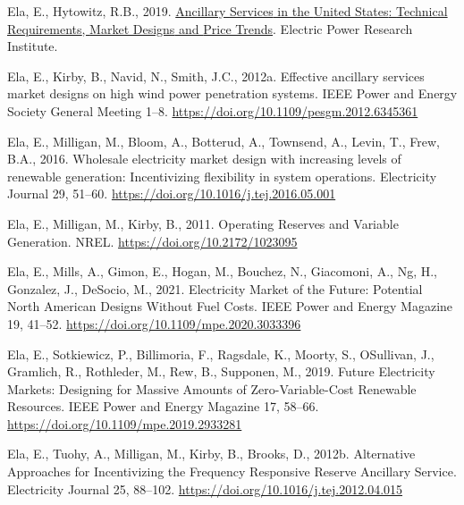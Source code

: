 \documentclass[12pt,a4paper,]{report}
\newlength{\cslhangindent}
\newenvironment{CSLReferences}[2] %
 {%
  \setlength{\parindent}{0pt}
  \ifodd #1 \everypar{\setlength{\hangindent}{\cslhangindent}}\ignorespaces\fi
  \ifnum #2 > 0
  \setlength{\parskip}{#2\baselineskip}
  \fi
 }%
 {}
\begin{document}
\begin{CSLReferences}{1}{0}
\leavevmode{}%
Ela, E., Hytowitz, R.B., 2019.
\href{https://www.epri.com/research/products/000000003002015670}{Ancillary
{Services} in the {United States}: {Technical Requirements}, {Market
Designs} and {Price Trends}}. {Electric Power Research Institute}.

\leavevmode{}%
Ela, E., Kirby, B., Navid, N., Smith, J.C., 2012a. Effective ancillary
services market designs on high wind power penetration systems. IEEE
Power and Energy Society General Meeting 1--8.
\url{https://doi.org/10.1109/pesgm.2012.6345361}

\leavevmode{}%
Ela, E., Milligan, M., Bloom, A., Botterud, A., Townsend, A., Levin, T.,
Frew, B.A., 2016. Wholesale electricity market design with increasing
levels of renewable generation: {Incentivizing} flexibility in system
operations. Electricity Journal 29, 51--60.
\url{https://doi.org/10.1016/j.tej.2016.05.001}

\leavevmode{}%
Ela, E., Milligan, M., Kirby, B., 2011. Operating {Reserves} and
{Variable Generation}. {NREL}. \url{https://doi.org/10.2172/1023095}

\leavevmode{}%
Ela, E., Mills, A., Gimon, E., Hogan, M., Bouchez, N., Giacomoni, A.,
Ng, H., Gonzalez, J., DeSocio, M., 2021. Electricity {Market} of the
{Future}: {Potential North American Designs Without Fuel Costs}. IEEE
Power and Energy Magazine 19, 41--52.
\url{https://doi.org/10.1109/mpe.2020.3033396}

\leavevmode{}%
Ela, E., Sotkiewicz, P., Billimoria, F., Ragsdale, K., Moorty, S.,
OSullivan, J., Gramlich, R., Rothleder, M., Rew, B., Supponen, M., 2019.
Future {Electricity Markets}: {Designing} for {Massive Amounts} of
{Zero-Variable-Cost Renewable Resources}. IEEE Power and Energy Magazine
17, 58--66. \url{https://doi.org/10.1109/mpe.2019.2933281}

\leavevmode{}%
Ela, E., Tuohy, A., Milligan, M., Kirby, B., Brooks, D., 2012b.
Alternative {Approaches} for {Incentivizing} the {Frequency Responsive
Reserve Ancillary Service}. Electricity Journal 25, 88--102.
\url{https://doi.org/10.1016/j.tej.2012.04.015}


\end{CSLReferences}
\end{document}
